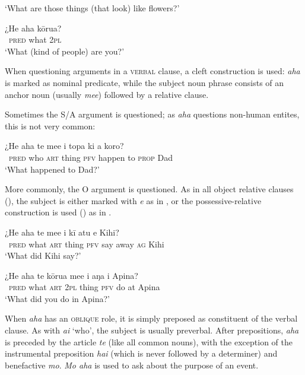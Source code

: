 \glt 
‘What are those things (that look) like flowers?’ \textstyleExampleref{[R210.195]} 
\z

\ea\label{ex:10.43}
\gll ¿He aha kōrua?\\
~\textsc{pred} what \textsc{2pl}\\

\glt 
‘What (kind of people) are you?’ \textstyleExampleref{[Egt-02.137]}
\z

When questioning arguments in a \textsc{verbal} clause, a cleft construction is used: \textit{aha} is marked as nominal predicate, while the subject noun phrase consists of an anchor noun (usually \textit{me{\ꞌ}e}) followed by a relative clause. 

Sometimes the S/A argument is questioned; as \textit{aha} questions non-human entites, this is not very common:

\ea\label{ex:10.44}
\gll ¿He aha te me{\ꞌ}e i topa ki a koro? \\
~\textsc{pred} who \textsc{art} thing \textsc{pfv} happen to \textsc{prop} Dad \\

\glt
‘What happened to Dad?’ \textstyleExampleref{[R615.594]} 
\z

More commonly, the O argument is questioned. As in all object relative clauses (), the subject is either marked with \textit{e} as in , or the possessive-relative construction is used () as in .

\ea\label{ex:10.45}
\gll ¿He aha te me{\ꞌ}e i kī atu e Kihi? \\
~\textsc{pred} what \textsc{art} thing \textsc{pfv} say away \textsc{ag} Kihi \\

\glt 
‘What did Kihi say?’ \textstyleExampleref{[R615.738]} 
\z

\ea\label{ex:10.46}
\gll ¿He aha te kōrua me{\ꞌ}e i aŋa i {\ꞌ}Apina? \\
~\textsc{pred} what \textsc{art} \textsc{2pl} thing \textsc{pfv} do at Apina \\

\glt 
‘What did you do in Apina?’ \textstyleExampleref{[R301.197]} 
\z

When \textit{aha} has an \textsc{oblique} role, it is simply preposed as constituent of the verbal clause. As with \textit{ai} ‘who’, the subject is usually preverbal. After prepositions, \textit{aha} is preceded by the article \textit{te} (like all common nouns), with the exception of the instrumental preposition \textit{hai} (which is never followed by a determiner) and benefactive \textit{mo}. \textit{Mo aha} is used to ask about the purpose of an event.

